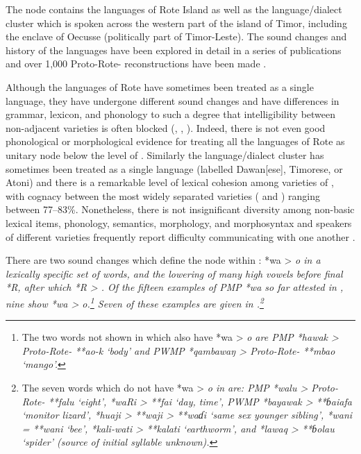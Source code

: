 The  node contains the languages of Rote Island
as well as the  language/dialect cluster which is spoken
across the western part of the island of Timor,
including the enclave of Oecusse (politically part of Timor-Leste).
The sound changes and history of the  languages
have been explored in detail in a series of publications
\citep{Edwards2016,Edwards2018a,Edwards2018c}
and over 1,000 Proto-Rote- reconstructions
have been made \citep{Edwards2021}.

Although the languages of Rote have sometimes been treated as
a single language, they have undergone different sound changes
and have differences in grammar,
lexicon, and phonology to such a degree that intelligibility
between non-adjacent varieties is often blocked
(\citealp[47]{GrimesTherikGrimesJacob1997}, \citealp[233]{Fox2016}, \citealp[2--4]{Tamelan2021}).
Indeed, there is not even good phonological or morphological
evidence for treating all the languages of Rote as unitary node
below the level of .
Similarly the  language/dialect cluster has sometimes been
treated as a single language (labelled Dawan[ese],
Timorese, or Atoni) and there is a remarkable level of lexical
cohesion among varieties of ,
with cognacy between the most widely separated varieties (
and ) ranging between 77--83{\%}.
Nonetheless, there is not insignificant diversity among non-basic
lexical items, phonology, semantics, morphology, and morphosyntax
and speakers of different varieties frequently report difficulty
communicating with one another \citep[6]{Edwards2020}.

There are two sound changes which define the 
node within : *wa > \it{o} in a lexically specific
set of words, and the lowering of many high vowels before final *R,
after which *R > {\0}.
Of the fifteen examples of PMP *wa so far attested in ,
nine show *wa > \it{o}.\footnote{
		The two words not shown in  which
		also have *wa > \it{o} are PMP *hawak > Proto-Rote- **ao-k
		‘body’ and PWMP *qambawaŋ > Proto-Rote- **mbao ‘mango’.}
Seven of these examples are given in .\footnote{
		The seven
		words which do not have *wa > \it{o} in  are:
		PMP *walu > Proto-Rote- **falu ‘eight’,
		*waRi > **fai ‘day,
		time’, PWMP *bayawak > **ɓaiafa ‘monitor lizard’,
		*huaji > **waji > **waɗi ‘same sex younger sibling’,
		*wani = **wani ‘bee’,
		*kali-wati > **kalati ‘earthworm’,
		and *lawaq > **ɓolau ‘spider’ (source of initial syllable unknown).}

